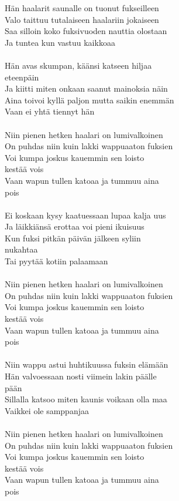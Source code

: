 
Hän haalarit saunalle on tuonut fukseilleen \\ Valo taittuu tutalaiseen haalariin jokaiseen \\ Saa silloin koko fuksivuoden nauttia olostaan \\ Ja tuntea kun vastuu kaikkoaa \\ \hspace{10mm} \\ Hän avas skumpan, käänsi katseen hiljaa \\ eteenpäin \\ Ja kiitti miten onkaan saanut mainoksia näin \\ Aina toivoi kyllä paljon mutta saikin enemmän \\ Vaan ei yhtä tiennyt hän \\ \hspace{10mm} \\ Niin pienen hetken haalari on lumivalkoinen \\ On puhdas niin kuin lakki wappuaaton fuksien \\ Voi kumpa joskus kauemmin sen loisto \\ kestää vois \\ Vaan wapun tullen katoaa ja tummuu aina \\ pois \\ \hspace{10mm} \\ Ei koskaan kysy kaatuessaan lupaa kalja uus \\ Ja läikkiänsä erottaa voi pieni ikuisuus \\ Kun fuksi pitkän päivän jälkeen syliin \\ nukahtaa \\ Tai pyytää kotiin palaamaan \\ \hspace{10mm} \\ Niin pienen hetken haalari on lumivalkoinen \\ On puhdas niin kuin lakki wappuaaton fuksien \\ Voi kumpa joskus kauemmin sen loisto \\ kestää vois \\ Vaan wapun tullen katoaa ja tummuu aina \\ pois \\ \hspace{10mm} \\ Niin wappu astui huhtikuussa fuksin elämään \\ Hän valvoessaan nosti viimein lakin päälle \\ pään \\ Sillalla katsoo miten kaunis voikaan olla maa \\ Vaikkei ole samppanjaa \\ \hspace{10mm} \\ Niin pienen hetken haalari on lumivalkoinen \\ On puhdas niin kuin lakki wappuaaton fuksien \\ Voi kumpa joskus kauemmin sen loisto \\ kestää vois \\ Vaan wapun tullen katoaa ja tummuu aina \\ pois